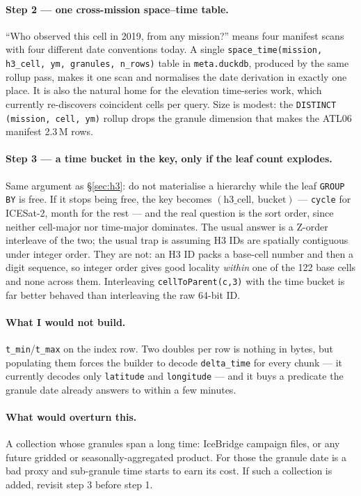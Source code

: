 \documentclass[11pt,a4paper]{article}
\newcommand{\code}[1]{\texttt{\small #1}}
\newcommand{\col}[1]{\texttt{\footnotesize #1}}
\begin{document}
\paragraph{Step 2 --- one cross-mission space--time table.}
``Who observed this cell in 2019, from any mission?'' means four manifest scans with four different date
conventions today. A single \code{space\_time(mission, h3\_cell, ym, granules, n\_rows)} table in
\code{meta.duckdb}, produced by the same rollup pass, makes it one scan and normalises the date derivation in
exactly one place. It is also the natural home for the elevation time-series work, which currently
re-discovers coincident cells per query. Size is modest: the \code{DISTINCT (mission, cell, ym)} rollup drops
the granule dimension that makes the ATL06 manifest 2.3\,M rows.

\paragraph{Step 3 --- a time bucket in the key, only if the leaf count explodes.}
Same argument as \S\ref{sec:h3}: do not materialise a hierarchy while the leaf \code{GROUP BY} is free. If it
stops being free, the key becomes \((\text{h3\_cell},\ \text{bucket})\) --- \col{cycle} for ICESat-2, month
for the rest --- and the real question is the sort order, since neither cell-major nor time-major dominates.
The usual answer is a Z-order interleave of the two; the usual trap is assuming H3 IDs are spatially
contiguous under integer order. They are not: an H3 ID packs a base-cell number and then a digit sequence, so
integer order gives good locality \emph{within} one of the 122 base cells and none across them. Interleaving
\code{cellToParent(c,3)} with the time bucket is far better behaved than interleaving the raw 64-bit ID.

\paragraph{What I would not build.} \col{t\_min}/\col{t\_max} on the index row. Two doubles per row is nothing
in bytes, but populating them forces the builder to decode \col{delta\_time} for every chunk --- it currently
decodes only \col{latitude} and \col{longitude} --- and it buys a predicate the granule date already answers
to within a few minutes.

\paragraph{What would overturn this.} A collection whose granules span a long time: IceBridge campaign files,
or any future gridded or seasonally-aggregated product. For those the granule date is a bad proxy and
sub-granule time starts to earn its cost. If such a collection is added, revisit step 3 before step 1.
\end{document}
